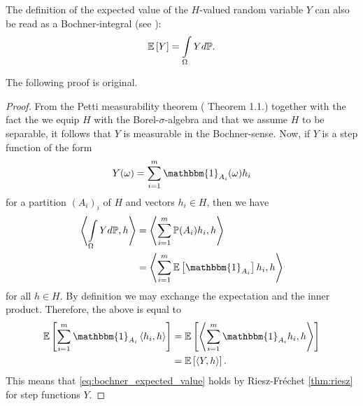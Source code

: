 \begin{remark}
    The definition of the expected value of the $H$-valued random variable $Y$ can also be read as a Bochner-integral (see \cite{bochner1933integration}):
    \begin{equation} \label{eq:bochner_expected_value}
        \mathbb{E}\left[Y\right] = \int\limits_{\Omega} Y d\mathbb{P}.
    \end{equation}
\end{remark}
The following proof is original.
\begin{proof}
    From the Petti measurability theorem (\cite{pettis1938integration} Theorem 1.1.) together with the fact the we equip $H$ with the Borel-$\sigma$-algebra and that we assume $H$ to be separable, it follows that $Y$ is measurable in the Bochner-sense. Now, if $Y$ is a step function of the form
    \[ Y(\omega) = \sum\limits_{i=1}^m \mathbbm{1}_{A_i}(\omega) h_i \]
    for a partition $(A_i)_i$ of $H$ and vectors $h_i \in H$, then we have
    \begin{align*}
        \left\langle \int\limits_{\Omega} Y d\PP, h \right\rangle
        & = \left\langle \sum\limits_{i=1}^m \PP(A_i) h_i, h \right\rangle \\
        & = \left\langle \sum\limits_{i=1}^m \EE{\mathbbm{1}_{A_i}} h_i, h \right\rangle
    \end{align*}
    for all $h \in H$. By definition we may exchange the expectation and the inner product. Therefore, the above is equal to
    \begin{align*}
        \EE{\sum\limits_{i=1}^m \mathbbm{1}_{A_i} \left\langle h_i, h \right\rangle}
        & = \EE{\left\langle \sum\limits_{i=1}^m \mathbbm{1}_{A_i} h_i, h \right\rangle} \\
        & = \EE{\left\langle Y, h \right\rangle}.
    \end{align*}
    This means that \ref{eq:bochner_expected_value} holds by Riesz-Fréchet \ref{thm:riesz} for step functions $Y$.


\end{proof}
